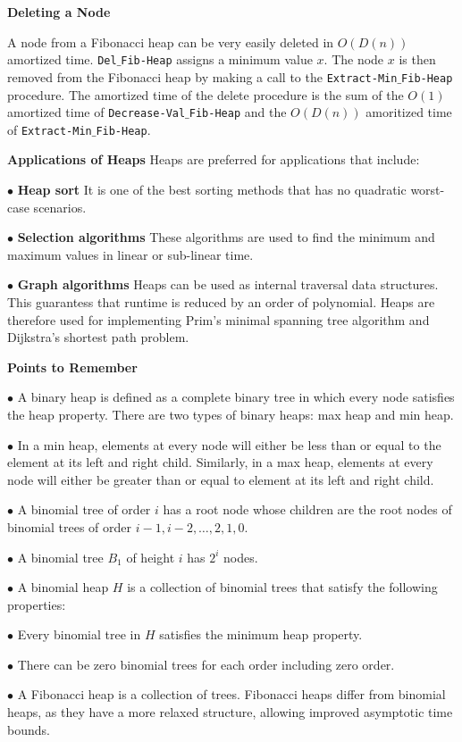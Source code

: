 \vskip 3mm
{\bf Deleting a Node}

\vskip 1mm
A node from a Fibonacci heap can be very easily deleted in $O(D(n))$ amortized time. {\tt Del$\_$Fib-Heap} assigns a minimum value $x$. The node $x$ is then removed from the Fibonacci heap by making a call to the {\tt Extract-Min$\_$Fib-Heap} procedure. The amortized time of the delete procedure is the sum of the $O(1)$ amortized time of  {\tt Decrease-Val$\_$Fib-Heap} and the $O(D(n))$ amoritized time of {\tt Extract-Min$\_$Fib-Heap}.

\filbreak
\vskip 1cm
{\bf Applications of Heaps}
\vskip 1mm
Heaps are preferred for applications that include:

\vskip 2mm
\qquad$\bullet$ {\bf Heap sort} It is one of the best sorting methods that has no quadratic worst-case scenarios.

\vskip 3mm
\qquad$\bullet$ {\bf Selection algorithms} These algorithms are used to find the minimum and maximum values in linear or sub-linear time.

\vskip 3mm
\qquad$\bullet$ {\bf Graph algorithms} Heaps can be used as internal traversal data structures. This guarantess that runtime is reduced by an order of polynomial. Heaps are therefore used for implementing Prim's minimal spanning tree algorithm and Dijkstra's shortest path problem.

\filbreak
\vskip 1cm
{\bf Points to Remember}

\vskip 2mm
$\bullet$ A binary heap is defined as a complete binary tree in which every node satisfies the heap property. There are two types of binary heaps: max heap and min heap.

\vskip 3mm
$\bullet$ In a min heap, elements at every node will either be less than or equal to the element at its left and right child. Similarly, in a max heap, elements at every node will either be greater than or equal to element at its left and right child.

\vskip 3mm
$\bullet$ A binomial tree of order $i$ has a root node whose children are the root nodes of binomial trees of order $i-1, i-2,\ldots, 2, 1, 0$.

\vskip 3mm
$\bullet$ A binomial tree $B_1$ of height $i$ has $2^i$ nodes.

\vskip 3mm
$\bullet$ A binomial heap $H$ is a collection of binomial trees that satisfy the following properties:

\vskip 1mm
\qquad$\bullet$ Every binomial tree in $H$ satisfies the minimum heap property.

\vskip 2mm
\qquad$\bullet$ There can be zero binomial trees for each order including zero order.

\vskip 3mm
$\bullet$ A Fibonacci heap is a collection of trees. Fibonacci heaps differ from binomial heaps, as they have a more relaxed structure, allowing improved asymptotic time bounds.



\vfill\eject
\bye

